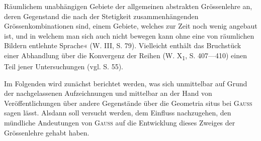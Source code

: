 Räumlichem unabhängigen Gebiete der allgemeinen abstrakten Grössenlehre
an, deren Gegenstand die nach der Stetigkeit zusammenhängenden Grössenkombinationen
sind, einem Gebiete, welches zur Zeit noch wenig angebaut ist,
und in welchem man sich auch nicht bewegen kann ohne eine von räumlichen
Bildern entlehnte Sprache« (W. III, S. 79). Vielleicht enthält das Bruchstück
einer Abhandlung über die Konvergenz der Reihen (W. X\textsubscript{1}, S. 407—410)
einen Teil jener Untersuchungen (vgl. S. 55).
\par
Im Folgenden wird zunächst berichtet werden, was sich unmittelbar auf
Grund der nachgelassenen Aufzeichnungen und mittelbar an der Hand von
Veröffentlichungen über andere Gegenstände über die Geometria situs bei
\textsc{Gauss} sagen lässt. Alsdann soll versucht werden, dem Einfluss nachzugehen,
den mündliche Andeutungen von \textsc{Gauss} auf die Entwicklung dieses Zweiges
der Grössenlehre gehabt haben.
\clearpage\endgroup
